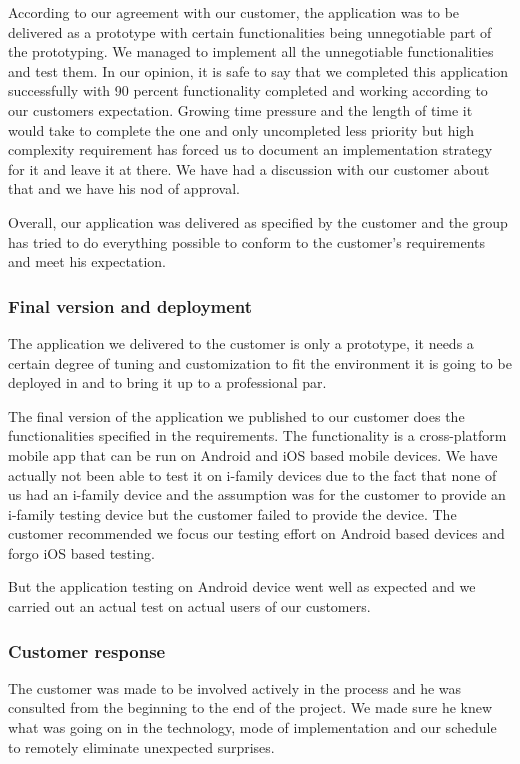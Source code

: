     According to our agreement with our customer, the application was to be delivered as a prototype with certain functionalities being unnegotiable part of the prototyping. We managed to implement all the unnegotiable functionalities and test them. In our opinion, it is safe to say that we completed this application successfully with 90 percent functionality completed and working according to our customers expectation. Growing time pressure and the length of time it would take to complete the one and only uncompleted less priority but high complexity requirement has forced us to document an implementation strategy for it and leave it at there. We have had a discussion with our customer about that and we have his nod of approval.

    Overall, our application was delivered as specified by the customer and the group has tried to do everything possible to conform to the customer's requirements and meet his expectation.
	\subsubsection{Final version and deployment}
The application we delivered to the customer is only a prototype, it needs a certain degree of tuning and customization to fit the environment it is going to be deployed in and to bring it up to a professional par.

The final version of the application we published to our customer does the functionalities specified in the requirements. The functionality is a cross-platform mobile app that can be run on Android and iOS based mobile devices. We have actually not been able to test it on i-family devices due to the fact that none of us had an i-family device and the assumption was for the customer to provide an i-family testing device but the customer failed to provide the device. The customer recommended we focus our testing effort on Android based devices and forgo iOS based testing.

But the application testing on Android device went well as expected and we carried out an actual test on actual users of our customers.


	\subsubsection{Customer response}
The customer was made to be involved actively in the process and he was consulted from the beginning to the end of the project. We made sure he knew what was going on in the technology, mode of implementation and our schedule to remotely eliminate unexpected surprises.

